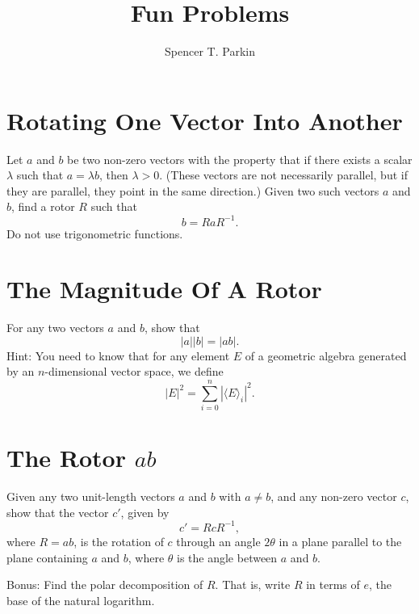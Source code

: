 \documentclass[12pt]{article}
\title{Fun Problems}
\author{Spencer T. Parkin}
\begin{document}
\maketitle

\section{Rotating One Vector Into Another}

Let $a$ and $b$ be two non-zero vectors with the property that if there
exists a scalar $\lambda$ such that $a=\lambda b$, then $\lambda>0$.
(These vectors are not necessarily parallel, but if they are parallel,
they point in the same direction.)  Given two such vectors $a$ and $b$,
find a rotor $R$ such that
\begin{equation}
b = RaR^{-1}.
\end{equation}
Do not use trigonometric functions.

\section{The Magnitude Of A Rotor}

For any two vectors $a$ and $b$, show that
\begin{equation}
|a||b| = |ab|.
\end{equation}
Hint: You need to know that for any element $E$ of a geometric algebra generated
by an $n$-dimensional vector space, we define
\begin{equation}
|E|^2 = \sum_{i=0}^n|\langle E\rangle_i|^2.
\end{equation}

\section{The Rotor $ab$}

Given any two unit-length vectors $a$ and $b$ with $a\neq b$, and any non-zero
vector $c$, show that the vector $c'$, given by
\begin{equation}
c' = RcR^{-1},
\end{equation}
where $R=ab$, is the rotation of $c$ through an angle $2\theta$
in a plane parallel to the plane containing $a$ and $b$, where $\theta$
is the angle between $a$ and $b$.

Bonus: Find the polar decomposition of $R$.  That is, write $R$
in terms of $e$, the base of the natural logarithm.
\end{document}
